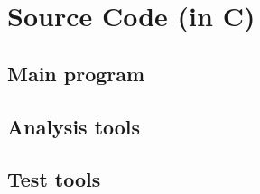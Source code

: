 \chapter{Source Code (in C)}

\section{Main program}





\section{Analysis tools}
%
%
%


\section{Test tools}
